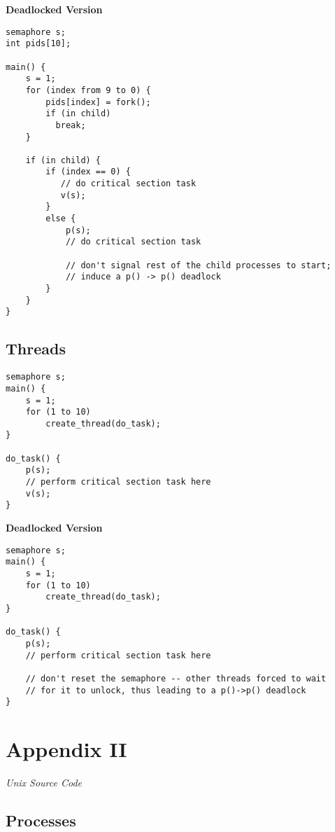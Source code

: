 \documentclass[12pt]{article}
\newcommand {\filename}[1] {\flushleft \textbf{#1}}
\newcommand {\append}[2] {\section*{Appendix #1} \textsl{\large #2}}
\newcommand {\includesource}[2] {\inputminted[linenos, fontsize=\scriptsize, frame=lines]{#1}{#2}}
\begin{document}
\filename{Deadlocked Version}
\begin{scriptsize}
\begin{verbatim}
semaphore s;
int pids[10];

main() {
    s = 1;
    for (index from 9 to 0) {
        pids[index] = fork();
        if (in child)
          break;
    }

    if (in child) {
        if (index == 0) {
           // do critical section task
           v(s);
        }
        else {
            p(s);
            // do critical section task
            
            // don't signal rest of the child processes to start;
            // induce a p() -> p() deadlock
        }
    }
}
\end{verbatim}
\end{scriptsize}


\subsection*{Threads}

\begin{scriptsize}
\begin{verbatim}
semaphore s;
main() {
    s = 1;
    for (1 to 10)
        create_thread(do_task);
}

do_task() {
    p(s);
    // perform critical section task here
    v(s);
}
\end{verbatim}
\end{scriptsize}

\filename{Deadlocked Version}
\begin{scriptsize}
\begin{verbatim}
semaphore s;
main() {
    s = 1;
    for (1 to 10)
        create_thread(do_task);
}

do_task() {
    p(s);
    // perform critical section task here

    // don't reset the semaphore -- other threads forced to wait
    // for it to unlock, thus leading to a p()->p() deadlock
}
\end{verbatim}
\end{scriptsize}


\append{II} {Unix Source Code}

\subsection*{Processes}
\includesource{c}{unix_processes.c}
\end{document}
